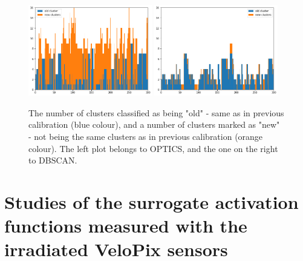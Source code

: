 \begin{figure}[H]
\centering
\includegraphics[width=0.48\textwidth]{figures/chapter4/velopix_clusters/optics_progress.png}
\includegraphics[width=0.48\textwidth]{figures/chapter4/velopix_clusters/dbscan_progress.png}
\caption{ The number of clusters classified as being "old" - same as in previous calibration (blue colour), and a number of clusters marked as "new" - not being the same clusters as in previous calibration (orange colour). The left plot belongs to OPTICS, and the one on the right to DBSCAN.
}
\label{fig:progress}
\end{figure}

\section{Studies of the surrogate activation functions measured with the irradiated VeloPix sensors}
\label{sec:surrogates-study}

